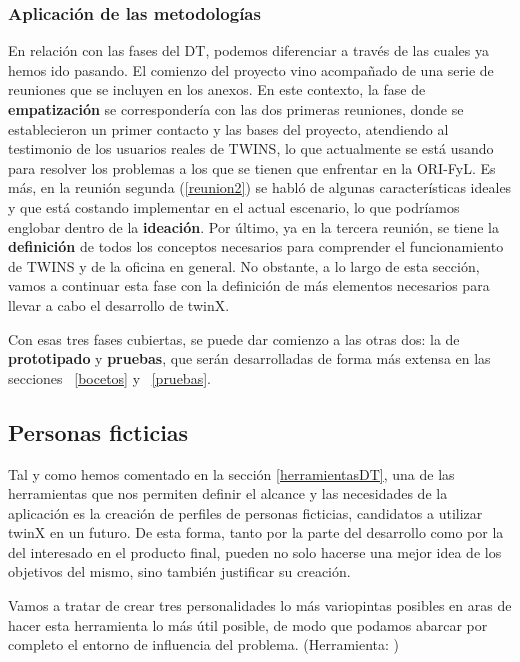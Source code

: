 \subsubsection{Aplicación de las metodologías}

En relación con las fases del DT, podemos diferenciar a través de las cuales ya hemos ido pasando. El comienzo del proyecto vino acompañado de una serie de reuniones que se incluyen en los anexos. En este contexto, la fase de \textbf{empatización} se correspondería con las dos primeras reuniones, donde se establecieron un primer contacto y las bases del proyecto, atendiendo al testimonio de los usuarios reales de TWINS, lo que actualmente se está usando para resolver los problemas a los que se tienen que enfrentar en la ORI-FyL. Es más, en la reunión segunda (\ref{reunion2}) se habló de algunas características ideales y que está costando implementar en el actual escenario, lo que podríamos englobar dentro de la \textbf{ideación}. Por último, ya en la tercera reunión, se tiene la \textbf{definición} de todos los conceptos necesarios para comprender el funcionamiento de TWINS y de la oficina en general. No obstante, a lo largo de esta sección, vamos a continuar esta fase con la definición de más elementos necesarios para llevar a cabo el desarrollo de twinX.

Con esas tres fases cubiertas, se puede dar comienzo a las otras dos: la de \textbf{prototipado} y \textbf{pruebas}, que serán desarrolladas de forma más extensa en las secciones ~\ref{bocetos} y ~\ref{pruebas}. %

\subsection{Personas ficticias}

Tal y como hemos comentado en la sección \ref{herramientasDT}, una de las herramientas que nos permiten definir el alcance y las necesidades de la aplicación es la creación de perfiles de personas ficticias, candidatos a utilizar twinX en un futuro. De esta forma, tanto por la parte del desarrollo como por la del interesado en el producto final, pueden no solo hacerse una mejor idea de los objetivos del mismo, sino también justificar su creación.

Vamos a tratar de crear tres personalidades lo más variopintas posibles en aras de hacer esta herramienta lo más útil posible, de modo que podamos abarcar por completo el entorno de influencia del problema. (Herramienta: \citep{xtensio})

